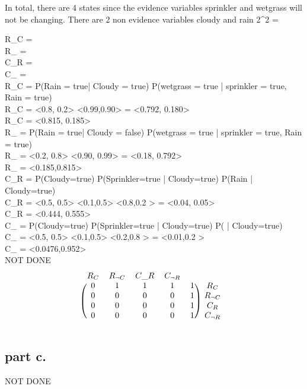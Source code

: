   In total, there are 4 states since the evidence variables sprinkler and wetgrass will not be changing.
  There are 2 non evidence variables cloudy and rain 2^2 = 

\noindent
R_C         =  \\
R_{} =  \\
C_R         =  \\
C_{} =   \\

\noindent
R_C        = \alpha P(Rain = true| Cloudy = true) P(wetgrass = true | sprinkler = true, Rain = true) \\
R_C        = \alpha <0.8, 0.2> <0.99,0.90> = \alpha <0.792, 0.180> \\
R_C        =  <0.815, 0.185> \\

\noindent
R_{}  = \alpha P(Rain = true| Cloudy = false) P(wetgrass = true | sprinkler = true, Rain = true) \\
R_{}  = \alpha <0.2, 0.8> <0.90, 0.99> = \alpha <0.18, 0.792> \\
R_{}  = <0.185,0.815> \\

\noindent
C_R        = \alpha P(Cloudy=true) P(Sprinkler=true | Cloudy=true) P(Rain | Cloudy=true) \\
C_R        = \alpha <0.5, 0.5> <0.1,0.5> <0.8,0.2 > = \alpha <0.04, 0.05>  \\
C_R        = <0.444, 0.555> \\

\noindent
C_{}   = \alpha P(Cloudy=true) P(Sprinkler=true | Cloudy=true) P( | Cloudy=true) \\
C_{}   = \alpha <0.5, 0.5> <0.1,0.5> <0.2,0.8 > = \alpha <0.01,0.2 >  \\
C_{}   = <0.0476,0.952>    \\

NOT DONE
  \[
\begin{blockarray}{cccccc}
R_C & R_{\neg{C}}  & C\_R & C_{\neg{R}} \\
\begin{block}{(ccccc)c}
  0 & 1 & 1 & 1 & 1 & R_C   \\
  0 & 0 & 0 & 0 & 1 & R_{\neg{C}} \\
  0 & 0 & 0 & 0 & 1 & C_R  \\
  0 & 0 & 0 & 0 & 1 & C_{\neg{R}} \\
\end{block}
\end{blockarray}
 \]

\subsection{part c.}

  NOT DONE
